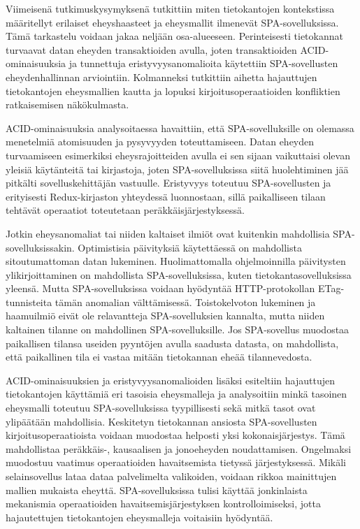 \documentclass[finnish,twoside,censored,csm,sw-track-2018]{HYthesisML}
\begin{document}
Viimeisenä tutkimuskysymyksenä tutkittiin miten tietokantojen kontekstissa määritellyt erilaiset eheyshaasteet ja eheysmallit ilmenevät SPA-sovelluksissa. Tämä tarkastelu voidaan jakaa neljään osa-alueeseen. Perinteisesti tietokannat turvaavat datan eheyden transaktioiden avulla, joten transaktioiden ACID-ominaisuuksia ja tunnettuja eristyvyysanomalioita käytettiin SPA-sovellusten eheydenhallinnan arviointiin. Kolmanneksi tutkittiin aihetta hajauttujen tietokantojen eheysmallien kautta ja lopuksi kirjoitusoperaatioiden konfliktien ratkaisemisen näkökulmasta.

ACID-ominaisuuksia analysoitaessa havaittiin, että SPA-sovelluksille on olemassa menetelmiä atomisuuden ja pysyvyyden toteuttamiseen. Datan eheyden turvaamiseen esimerkiksi eheysrajoitteiden avulla ei sen sijaan vaikuttaisi olevan yleisiä käytänteitä tai kirjastoja, joten SPA-sovelluksissa siitä huolehtiminen jää pitkälti sovelluskehittäjän vastuulle. Eristyvyys toteutuu SPA-sovellusten ja erityisesti Redux-kirjaston yhteydessä luonnostaan, sillä paikalliseen tilaan tehtävät operaatiot toteutetaan peräkkäisjärjestyksessä.

Jotkin eheysanomaliat tai niiden kaltaiset ilmiöt ovat kuitenkin mahdollisia SPA-sovelluksissakin. Optimistisia päivityksiä käytettäessä on mahdollista sitoutumattoman datan lukeminen. Huolimattomalla ohjelmoinnilla päivitysten ylikirjoittaminen on mahdollista SPA-sovelluksissa, kuten tietokantasovelluksissa yleensä. Mutta SPA-sovelluksissa voidaan hyödyntää HTTP-protokollan ETag-tunnisteita tämän anomalian välttämisessä. Toistokelvoton lukeminen ja haamuilmiö eivät ole relavantteja SPA-sovelluksien kannalta, mutta niiden kaltainen tilanne on mahdollinen SPA-sovelluksille. Jos SPA-sovellus muodostaa paikallisen tilansa useiden pyyntöjen avulla saadusta datasta, on mahdollista, että paikallinen tila ei vastaa mitään tietokannan eheää tilannevedosta.

ACID-ominaisuuksien ja eristyvyysanomalioiden lisäksi esiteltiin hajauttujen tietokantojen käyttämiä eri tasoisia eheysmalleja ja analysoitiin minkä tasoinen eheysmalli toteutuu SPA-sovelluksissa tyypillisesti sekä mitkä tasot ovat ylipäätään mahdollisia. Keskitetyn tietokannan ansiosta SPA-sovellusten kirjoitusoperaatioista voidaan muodostaa helposti yksi kokonaisjärjestys. Tämä mahdollistaa peräkkäis-, kausaalisen ja jonoeheyden noudattamisen. Ongelmaksi muodostuu vaatimus operaatioiden havaitsemista tietyssä järjestyksessä. Mikäli selainsovellus lataa dataa palvelimelta valikoiden, voidaan rikkoa mainittujen mallien mukaista eheyttä. SPA-sovelluksissa tulisi käyttää jonkinlaista mekanismia operaatioiden havaitsemisjärjestyksen kontrolloimiseksi, jotta hajautettujen tietokantojen eheysmalleja voitaisiin hyödyntää.
\end{document}

